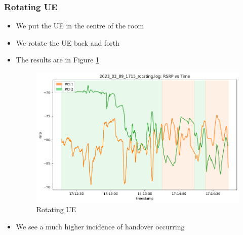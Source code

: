 \subsubsection{Rotating UE}
\begin{itemize}
    \item We put the UE in the centre of the room
    \item We rotate the UE back and forth
    \item The results are in Figure \ref{fig:methods:2024-02-09-rotate}
    \begin{figure}
        \centering
        \includegraphics[width=0.75\linewidth]{src//img/2024_02_09_rotating.png}
        \caption{Rotating UE}
        \label{fig:methods:2024-02-09-rotate}
    \end{figure}
    \item We see a much higher incidence of handover occurring
\end{itemize}


